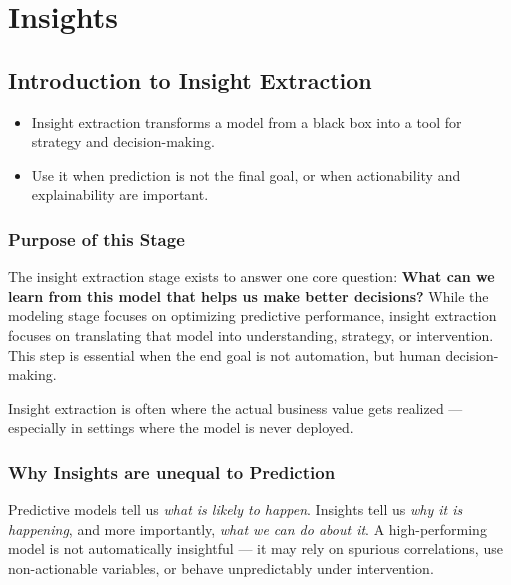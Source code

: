 \documentclass[12pt,openany]{book}
\begin{document}
\part{Insights}




\chapter{Introduction to Insight Extraction}

\begin{summarybox}
\begin{itemize}
  \item Insight extraction transforms a model from a black box into a tool for strategy and decision-making.
  \item Use it when prediction is not the final goal, or when actionability and explainability are important.
\end{itemize}
\end{summarybox}



\section{Purpose of this Stage}

The insight extraction stage exists to answer one core question: \textbf{What can we learn from this model that helps us make better decisions?} While the modeling stage focuses on optimizing predictive performance, insight extraction focuses on translating that model into understanding, strategy, or intervention. This step is essential when the end goal is not automation, but human decision-making.

\begin{notebox}
Insight extraction is often where the actual business value gets realized — especially in settings where the model is never deployed.
\end{notebox}



\section{Why Insights are unequal to Prediction}

Predictive models tell us \emph{what is likely to happen}. Insights tell us \emph{why it is happening}, and more importantly, \emph{what we can do about it}. A high-performing model is not automatically insightful — it may rely on spurious correlations, use non-actionable variables, or behave unpredictably under intervention.
\end{document}
